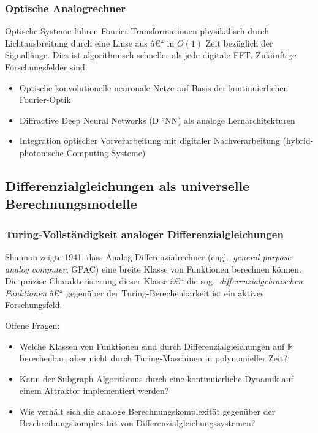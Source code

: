 ﻿\documentclass[a4paper,12pt]{article}
\theoremstyle{definition}
\begin{document}
\subsubsection{Optische Analogrechner}

Optische Systeme führen Fourier-Transformationen physikalisch durch Lichtausbreitung
durch eine Linse aus â€“ in $O(1)$ Zeit bezüglich der Signallänge.  Dies ist
algorithmisch schneller als jede digitale FFT.  Zukünftige Forschungsfelder sind:
\begin{itemize}
    \item Optische konvolutionelle neuronale Netze auf Basis der kontinuierlichen
          Fourier-Optik \citep{Lin2018}
    \item Diffractive Deep Neural Networks (D ²NN) als analoge Lernarchitekturen
    \item Integration optischer Vorverarbeitung mit digitaler Nachverarbeitung
          (hybrid-photonische Computing-Systeme)
\end{itemize}

\subsection{Differenzialgleichungen als universelle Berechnungsmodelle}

\subsubsection{Turing-Vollständigkeit analoger Differenzialgleichungen}

Shannon \citep{Shannon1941} zeigte 1941, dass Analog-Differenzialrechner
(engl.\ \emph{general purpose analog computer}, GPAC) eine breite Klasse von
Funktionen berechnen können.  Die präzise Charakterisierung dieser Klasse â€“
die sog.\ \emph{differenzialgebraischen Funktionen} â€“ gegenüber der Turing-Berechenbarkeit
ist ein aktives Forschungsfeld.

Offene Fragen:
\begin{itemize}
    \item Welche Klassen von Funktionen sind durch Differenzialgleichungen auf $\mathbb{R}$
          berechenbar, aber nicht durch Turing-Maschinen in polynomieller Zeit?
    \item Kann der Subgraph Algorithmus \citep{Epp2026subgraph} durch eine
          kontinuierliche Dynamik auf einem Attraktor implementiert werden?
    \item Wie verhält sich die analoge Berechnungskomplexität gegenüber der
          Beschreibungskomplexität von Differenzialgleichungssystemen?
\end{itemize}
\end{document}
